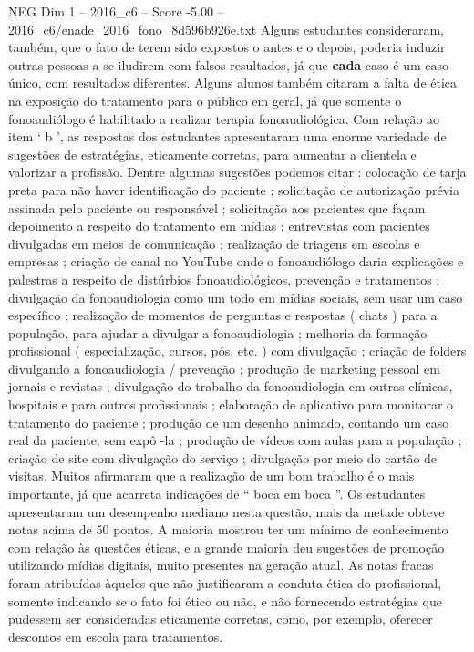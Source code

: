\begin{textsample}{NEG Dim 1 – 2016\_c6 – Score -5.00 – 2016\_c6/enade\_2016\_fono\_8d596b926e.txt}
Alguns estudantes consideraram, também, que o fato de terem sido expostos o antes e o depois, poderia induzir outras pessoas a se iludirem com falsos resultados, já que \textbf{cada} caso é um caso único, com resultados diferentes.
Alguns alunos também citaram a falta de ética na exposição do tratamento para o público em geral, já que somente o fonoaudiólogo é habilitado a realizar terapia fonoaudiológica.
Com relação ao item ‘ b ’, as respostas dos estudantes apresentaram uma enorme variedade de sugestões de estratégias, eticamente corretas, para aumentar a clientela e valorizar a profissão.
Dentre algumas sugestões podemos citar : colocação de tarja preta para não haver identificação do paciente ; solicitação de autorização prévia assinada pelo paciente ou responsável ; solicitação aos pacientes que façam depoimento a respeito do tratamento em mídias ; entrevistas com pacientes divulgadas em meios de comunicação ; realização de triagens em escolas e empresas ; criação de canal no YouTube onde o fonoaudiólogo daria explicações e palestras a respeito de distúrbios fonoaudiológicos, prevenção e tratamentos ; divulgação da fonoaudiologia como um todo em mídias sociais, sem usar um caso específico ; realização de momentos de perguntas e respostas ( chats ) para a população, para ajudar a divulgar a fonoaudiologia ; melhoria da formação profissional ( especialização, cursos, pós, etc. ) com divulgação ; criação de folders divulgando a fonoaudiologia / prevenção ; produção de marketing pessoal em jornais e revistas ; divulgação do trabalho da fonoaudiologia em outras clínicas, hospitais e para outros profissionais ; elaboração de aplicativo para monitorar o tratamento do paciente ; produção de um desenho animado, contando um caso real da paciente, sem expô -la ; produção de vídeos com aulas para a população ; criação de site com divulgação do serviço ; divulgação por meio do cartão de visitas.
Muitos afirmaram que a realização de um bom trabalho é o mais importante, já que acarreta indicações de “ boca em boca ”.
Os estudantes apresentaram um desempenho mediano nesta questão, mais da metade obteve notas acima de 50 pontos.
A maioria mostrou ter um mínimo de conhecimento com relação às questões éticas, e a grande maioria deu sugestões de promoção utilizando mídias digitais, muito presentes na geração atual.
As notas fracas foram atribuídas àqueles que não justificaram a conduta ética do profissional, somente indicando se o fato foi ético ou não, e não fornecendo estratégias que pudessem ser consideradas eticamente corretas, como, por exemplo, oferecer descontos em escola para tratamentos.

\end{textsample}
